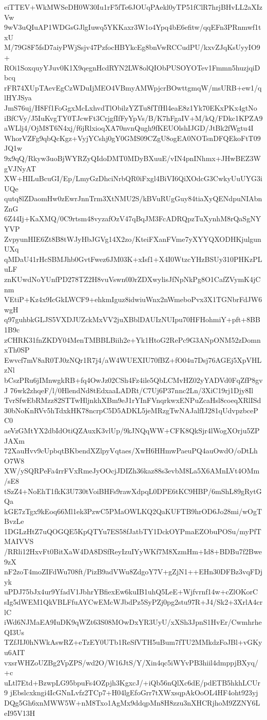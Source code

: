 eiTTEV+WkMWSeDH0W30Iu1rF5fTe6JOUqPAekl0yTP51fClR7hrjBHvLL2aXIzVw
9wV3uQIuAP1WDGsGJlgIuwq5YKKaxr3W1o4Ypq4bE6efitw/qqEFn3PRnmwf1txU
M/79G8F5fsD7aiyPWjSsjv47PzfocHBYkcEg8bnVwRCCudPU/kxvZJqKsUyyIO9+
ROi1SoxquyYJuv0K1X9qegnHcdRYN2LW8olQIObPUSOYOTev1Fmmn5huzjqiDbcq
rFR74XUpTAevEgCzWDuIjMEO4VBmyAMWpjcrBOwttgmqW/msURB+ew1/qlHYJSya
JmS76uj/H8Ff1FoGgxMcLxhvdTlObilzYZTu8fTfHl4eaE8z1Yk70EKxPKx4gtNo
iBfCVy/J5IuKvgTY0TJcwFt3CrjgfIfFyYpVs/B/K7hFgaIV+M/kQ/FDkc1KPZA9
aWLlj4/OjM8T6N4xj/f6jRlxioqXA70nvnQugh9fKEUOlshIJGD/JtBk2fWgtu4I
WhorVZFg9qbQcKgz+VyjYCshj0gY0GMS09CZgU8ogEA0NOTsnDFQEkoFtT09JQ1w
9x9qQ/Rkyw3uoBjWYRZyQIdoDMT0MDyBXuuE/vIN4pnINhmx+JHwBEZ3WgVJNyAT
XW+HILuBcuGI/Ep/LmyGzDhciNrbQR0iFxgl4BiVI6QiXOdcG3CwkyUuUYG3iUQe
qutq8lZDaomHw0zEwrJnnTrm3XtNMU2S/kBVuRUgGuy84tiaXyQENdpuNIAbnZnG
6Z44Ij+KaXMQ/0C9rtsm48vyzafOzV47qBqJM3FcADRQpzTuXynhM8rQaSgNYYVP
ZvpyunHIE6Zt8B8tWJyHbJGVg14X2zo/KteiFXanFVme7yXYYQXODHKjulgunUXq
qMDaU41rHcSBMJhb0GvtFwez6JM03K+xIsf1+X4I0WtzcYHzBSUy310PHKzPLuLF
znKUwdNoYUnfPD278TZ2H8vuVswn0l0rZDXwylisJfNpNkPg8O1CafZVymK4jCnm
VEtiP+Kz4x9IcGkLWCF9+ehkmIguz8idwiuWnx2nWmeboPvx3X1TGNbrFdJW6wgH
q97guhbkGLJS5VXDJUZckMxVV2juXBblDAUIzNUIpu70HFHohmiY+pft+8BB1B9c
zCHRK31fnZKDY04MenTMBBLBiih2e+Yk1HtoG2RePc9G3ANpONM52zDomnxTh0SP
Ewvcf7mV8aR0TJ0zNQr1R7j4/aW4WUEXIU70fBZ+fO04u7Dsj76AGEj5XpVHLzNl
bCszPRu6jIMnwgkRB+fq4OwJz02CSh4Fz4ile5QbLCMvHZ02yYADVd0FqZfP8gvJ
76wk2zhqeF/l/0HlendNd8tEdxaaLADRt/C7Uj6P37nnc2Ln/3XiC19rj1Djy8Il
TvrSfwEbRMzz82STTwHljnkhXBm9eJ1rYInFVnqrkwxENPuZcaHsl8coeqXRlISd
30bNoKnRVv5hTdxkHK78ncrpC5D5ADKL5jeMRzgTwNAJalfIJ281qUdvpzbcePC0
aeVzGMtYX2dbIdOtiQZAuxK3vlUp/9kJNQqWW+CFK8QkSjr4lWogXOrju5ZPJAXm
72XauHvv9cUpbqtBKbendXZlpyVqtaes/XwH6HHmwPaeuPQ4auOwdO/oDtLhO7W8
XW/ySQRPeFa4rrFVxRmeJyOOcjJDIZh36kaz88s3evbM8La5X6AMnLVt4OMm/sE8
tSzZ4+NoEhT1fkK3U730tVoiBHFs9rawXdpqL0DPE6tKC9HBP/6mShL89gRytGQa
kGE7zTgx9kEoq66Ml1ek3PzwC5PMaOWLKQ2QaKUFTB9hrOD6Jo28mi/wOgTBvzLe
1DGLzHtZ7uQOGQE5KpQTYu7ES58fJatbTY1DckOYPmaEZObuPOSu/myPfTMAIVVS
/RRli12HxvFt0BitXaW4DA8DSfReyIzuIYyWKf7M8XzmHm+Id8+BDBu7f2Bwe9zX
nF2zoT4moZIFdWu708ft/PizB9adVWu8ZdgoY7V+gZjN1++EHn30DFBz3vqFDjyk
uPDJ75bJx4ur9YfadV1JbhrYBfiexEw6kuIB1uhQ5LeE+Wjfvrnf14w+cZlOKorC
sIg5dWEM1QkVBLFfuAYCwEMcWJbdPz5SyPZj0pg2stu97R+J4/Sk2+3XrlA4crlC
iWd6NJMaEA9IuDK9qWZt63S08MOwDxYR3UyU/xXSh3JpnS1HvEr/CwmhrheQI3Us
TZfJIJ0hNWkAswRZ+eTzEY0UTb1ReSfVTH5uBum7fTU2MMkdzFoJBl+vGKyu6AIT
vxsrWHZoUZBg2VpZPS/wd2O/W16JtS/Y/Xin4qc5iWYvPB3hiil4dmppjBXyq/+c
uLtl7Etd+BzwpLG95bpuFs4OZpjh3KgxcJ/+iQb56nQlXc6dE/pdETB5hkhLCUr9
jEbslcxkngi4IcGNnLvfz2TCp7+H04lgEfoGrr7tXWxsqpAkOoOL4HF4oht923yj
DQg5Gh6xnMWW5W+nM8Txo1AgMx9ddqpMn8H8zzu3nXHCRjhoM9ZZNY6LeI95V13H

